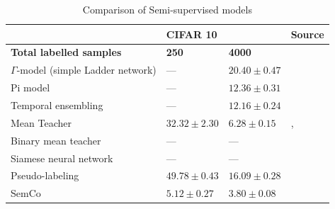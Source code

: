 \begin{table}[h!]
\centering
\begin{tabular}{|l|ll|l|}
\hline
                                & \multicolumn{2}{l|}{\textbf{CIFAR 10}}  & Source \\ \hline
\textbf{Total labelled samples} & \multicolumn{1}{l|}{\textbf{250}} & \textbf{4000} & \\ \hline
$\Gamma$-model (simple Ladder network) & \multicolumn{1}{l|}{---}&$20.40 \pm 0.47$&  \cite{Rasmus2015} \\ \hline
Pi model                        & \multicolumn{1}{l|}{---}& $12.36 \pm 0.31$& \cite{miyato2018virtual}\\ \hline
Temporal ensembling             & \multicolumn{1}{l|}{---}             & $12.16 \pm 0.24$  & \cite{miyato2018virtual}\\ \hline
Mean Teacher                    & \multicolumn{1}{l|}{$32.32 \pm 2.30$}&$6.28 \pm 0.15$ &\cite{nassar}, \cite{tarvainen} \\ \hline
Binary mean teacher             & \multicolumn{1}{l|}{---}& --- &              \\ \hline
Siamese neural network          & \multicolumn{1}{l|}{---} & --- &             \\ \hline
Pseudo-labeling                 & \multicolumn{1}{l|}{$49.78 \pm 0.43$}&$16.09 \pm 0.28$ & \cite{nassar} \\ \hline
SemCo & \multicolumn{1}{l|}{$5.12 \pm 0.27$}&$3.80 \pm 0.08$&\cite{nassar} \\ \hline
\end{tabular}
\caption{Comparison of Semi-supervised models}
\label{tab:comparison}
\end{table}
